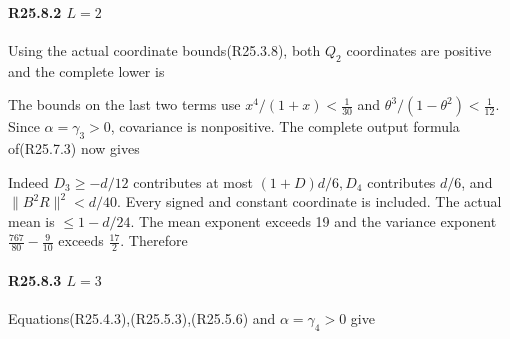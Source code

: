 
\paragraph{R25.8.2 \(L=2\)}

Using the actual coordinate bounds(R25.3.8), both \(Q_{2}\) coordinates are positive and the complete lower is


The bounds on the last two terms use \(x^4/(1+x)<\frac{1}{30}\) and \(\theta^3/(1-\theta^2)<\frac{1}{12}\). Since \(\alpha=\gamma_{3}>0\), covariance is nonpositive. The complete output formula of(R25.7.3) now gives


Indeed \(D_3\ge -d/12\) contributes at most \((1+D)d/6,\allowbreak \allowbreak  D_4\) contributes \(d/6\), and \(\lVert B^2R\rVert ^2<d/40\). Every signed and constant coordinate is included. The actual mean is \(\le 1-d/24\). The mean exponent exceeds 19 and the variance exponent \(\frac{767}{80}-\frac{9}{10}\) exceeds \(\frac{17}{2}\). Therefore


\paragraph{R25.8.3 \(L=3\)}

Equations(R25.4.3),(R25.5.3),(R25.5.6) and \(\alpha=\gamma_{4}>0\) give


